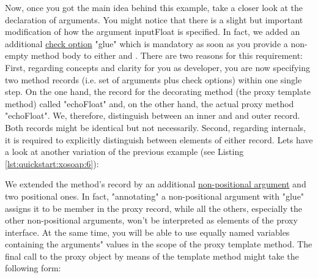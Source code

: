 Now, once you got the main idea behind this example, take a closer
look at the declaration of arguments. You might notice that
there is a slight but important modification of how the argument
inputFloat is specified. In fact, we added an additional
\href{http://media.wu-wien.ac.at/doc/tutorial.html#non-pos-args}{check
option} "glue" which is mandatory as soon as you provide a non-empty
method body to either
 and
. There are
two reasons for this requirement: First, regarding concepts and
clarity for you as developer, you are now specifying two method
records (i.e. set of arguments plus check options) within one single
step. On the one hand, the record for the decorating method (the proxy
template method) called "echoFloat" and, on the other hand, the actual
proxy method "echoFloat". We, therefore, distinguish between an inner
and and outer record. Both records might be identical but not
necessarily. Second, regarding internals, it is required to explicitly
distinguish between elements of either record. Lets have a look at
another variation of the previous example (see Listing
\ref{lst:quickstart:xosoap:6}):
%
%

%
We extended the method's record by an additional
\href{http://media.wu-wien.ac.at/doc/tutorial.html#non-pos-args}{non-positional
argument} and two positional ones. In fact, "annotating" a
non-positional argument with "glue" assigns it to be member in the
proxy record, while all the others, especially the other
non-positional arguments, won't be interpreted as elements of the
proxy interface. At the same time, you will be able to use equally
named variables containing the arguments" values in the scope of the
proxy template method. The final call to the proxy object by means of
the template method might take the following form:
%
%

